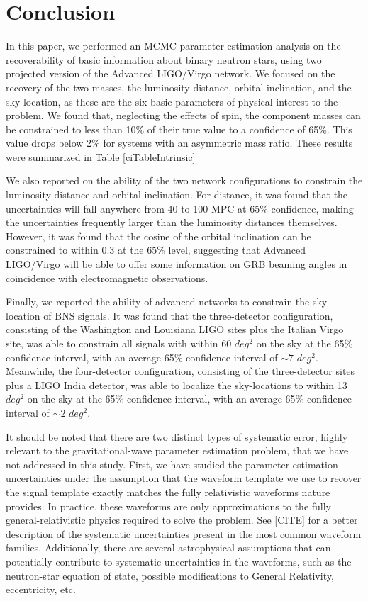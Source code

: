\documentclass[11pt,a4paper]{emulateapj}
\newcommand{\carl}[1]{{\color{red}  #1}}
\begin{document}
\section{Conclusion}
\label{conclusionSection}

In this paper, we performed an MCMC parameter estimation analysis on the recoverability of basic information about binary 
neutron stars, using two projected version of the Advanced LIGO/Virgo network.  We focused on the recovery of the two 
masses, the luminosity distance, orbital inclination, and the sky location, as these are the six basic parameters of physical 
interest to the problem.  We found that, neglecting the effects of spin, the component masses can be constrained to less
 than 10\% of their true value to a confidence of 65\%.  This value drops below 2\% for systems with an asymmetric mass ratio.
 These results were summarized in Table \ref{ciTableIntrinsic}
 
We also reported on the ability of the two network configurations to constrain the
luminosity distance and orbital inclination.  For distance, it was found that the uncertainties
will fall anywhere from 40 to 100 MPC at 65\% confidence, making the uncertainties frequently larger than the luminosity
distances themselves.  However, it was found that the cosine of the orbital inclination can be constrained to within 
0.3 at the 65\% level, suggesting that Advanced LIGO/Virgo will be able to offer some information on GRB beaming
angles in coincidence with electromagnetic observations.

Finally, we reported the ability of advanced networks to constrain the sky location of BNS signals.  It was found that 
the three-detector configuration, consisting of the Washington and Louisiana LIGO sites plus the Italian Virgo site,
 was able to constrain all signals with within 60 $deg^2$ on the sky at the 65\% confidence interval, with an average
65\% confidence interval of $\sim 7$ $deg^2$.  Meanwhile, the four-detector
configuration, consisting of the three-detector sites plus a LIGO India detector, was able to localize the sky-locations
to within  13 $deg^2$ on the sky at the 65\% confidence interval, with an average
65\% confidence interval of $\sim 2$ $deg^2$.

It should be noted that there are two distinct types of systematic error, highly relevant to the gravitational-wave parameter estimation problem, that we have not addressed in this study.  First, we have studied the parameter estimation uncertainties under the assumption that the waveform template we use to recover the signal template exactly matches the fully relativistic waveforms nature provides.  In practice, these waveforms are only approximations to the fully general-relativistic physics required to solve the problem.  See \carl{[CITE]} for a better description of the systematic uncertainties present in the most common waveform families.  Additionally, there are several astrophysical assumptions that can potentially contribute
to systematic uncertainties in the waveforms, such as the neutron-star equation of state, possible modifications to 
General Relativity, eccentricity, etc.
\end{document}
